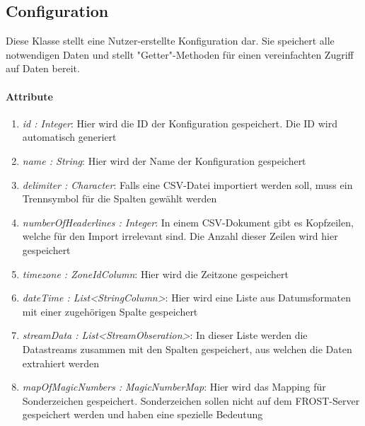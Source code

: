 \subsection*{Configuration}\label{config}
Diese Klasse stellt eine Nutzer-erstellte Konfiguration dar. 
Sie speichert alle notwendigen Daten und stellt "{Getter}"{-Methoden} für einen vereinfachten Zugriff auf Daten bereit.

\paragraph{Attribute}

\begin{enumerate}[-]
	\item \textit{id : Integer}: Hier wird die ID der Konfiguration gespeichert. Die ID wird automatisch generiert
	
	\item \textit{name : String}: Hier wird der Name der Konfiguration gespeichert
	
	\item \textit{delimiter : Character}: Falls eine CSV-Datei importiert werden soll, muss ein Trennsymbol für die Spalten gewählt werden
	
	\item \textit{numberOfHeaderlines : Integer}: In einem CSV-Dokument gibt es Kopfzeilen, welche für den Import irrelevant sind. Die Anzahl dieser Zeilen wird hier gespeichert
	
	\item \textit{timezone : ZoneIdColumn}: Hier wird die Zeitzone gespeichert
	
	\item \textit{dateTime : List<StringColumn>}: Hier wird eine Liste aus Datumsformaten mit einer zugehörigen Spalte gespeichert 
	
	\item \textit{streamData : List<StreamObseration>}: In dieser Liste werden die Datastreams zusammen mit den Spalten gespeichert, aus welchen die Daten extrahiert werden
	
	\item \textit{mapOfMagicNumbers : MagicNumberMap}: Hier wird das Mapping für Sonderzeichen gespeichert. Sonderzeichen sollen nicht auf dem FROST-Server gespeichert werden und haben eine spezielle Bedeutung
\end{enumerate}

